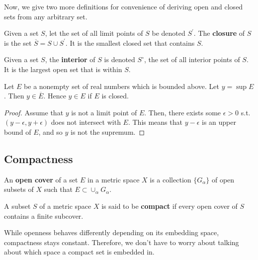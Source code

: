 \documentclass{article}
\begin{document}
    Now, we give two more definitions for convenience of deriving open and closed sets from any arbitrary set. 

    \begin{definition}[Closure]
      Given a set $S$, let the set of all limit points of $S$ be denoted $S^\prime$. The \textbf{closure} of $S$ is the set $\overline{S} = S \cup S^\prime$. It is the smallest closed set that contains $S$. 
    \end{definition}

    \begin{definition}[Interior]
      Given a set $S$, the \textbf{interior} of $S$ is denoted $S^\circ$, the set of all interior points of $S$. It is the largest open set that is within $S$. 
    \end{definition}

    \begin{theorem}
      Let $E$ be a nonempty set of real numbers which is bounded above. Let $y = \sup{E}$. Then $y \in \overline{E}$. Hence $y \in E$ if $E$ is closed. 
    \end{theorem}
    \begin{proof}
      Assume that $y$ is not a limit point of $E$. Then, there exists some $\epsilon > 0$ s.t. $(y - \epsilon, y + \epsilon)$ does not intersect with $E$. This means that $y - \epsilon$ is an upper bound of $E$, and so $y$ is not the supremum. 
    \end{proof}

  \subsection{Compactness}

    \begin{definition}
      An \textbf{open cover} of a set $E$ in a metric space $X$ is a collection $\{G_\alpha\}$ of open subsets of $X$ such that $E \subset \cup_\alpha G_\alpha$. 
    \end{definition}

    \begin{definition}
      A subset $S$ of a metric space $X$ is said to be \textbf{compact} if every open cover of $S$ contains a finite subcover. 
    \end{definition}

    While openness behaves differently depending on its embedding space, compactness stays constant. Therefore, we don't have to worry about talking about which space a compact set is embedded in. 
\end{document}

